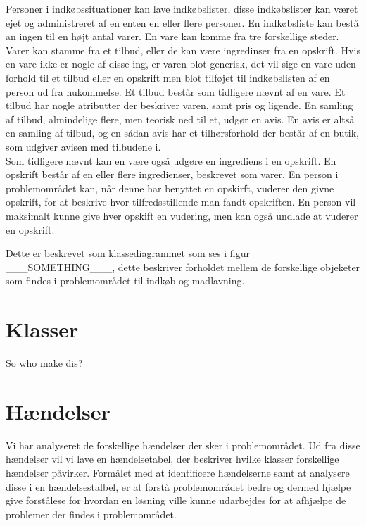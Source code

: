 Personer i indkøbssituationer kan lave indkøbslister, disse indkøbslister kan været ejet og administreret af en enten en eller flere personer. 
En indkøbsliste kan bestå an ingen til en højt antal varer.
En vare kan komme fra tre forskellige steder.
Varer kan stamme fra et tilbud, eller de kan være ingredinser fra en opskrift. 
Hvis en vare ikke er nogle af disse ing, er varen blot generisk, det vil sige en vare uden forhold til et tilbud eller en opskrift men blot tilføjet til indkøbslisten af en person ud fra hukommelse.
Et tilbud består som tidligere nævnt af en vare.
Et tilbud har nogle atributter der beskriver varen, samt pris og ligende.
En samling af tilbud, almindelige flere, men teorisk ned til et, udgør en avis. 
En avis er altså en samling af tilbud, og en sådan avis har et tilhørsforhold der består af en butik, som udgiver avisen med tilbudene i.\\
Som tidligere nævnt kan en være også udgøre en ingrediens i en opskrift.
En opskrift består af en eller flere ingredienser, beskrevet som varer.
En person i problemområdet kan, når denne har benyttet en opskirft, vuderer den givne opskrift, for at beskrive hvor tilfredsstillende man fandt opskriften.
En person vil maksimalt kunne give hver opskift en vudering, men kan også undlade at vuderer en opskrift.

Dette er beskrevet som klassediagrammet som ses i figur ___SOMETHING___, dette beskriver forholdet mellem de forskellige objeketer som findes i problemområdet til indkøb og madlavning.

\section{Klasser}
So who make dis?

\section{Hændelser}
Vi har analyseret de forskellige hændelser der sker i problemområdet. 
Ud fra disse hændelser vil vi lave en hændelsetabel, der beskriver hvilke klasser forskellige hændelser påvirker.
Formålet med at identificere hændelserne samt at analysere disse i en hændelsestalbel, er at forstå problemområdet bedre og dermed hjælpe give forstålese for hvordan en løsning ville kunne udarbejdes for at afhjælpe de problemer der findes i problemområdet.




